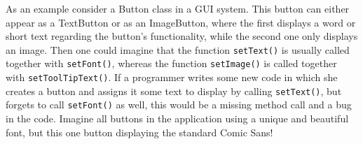As an example consider a Button class in a GUI system.
This button can either appear as a TextButton or as an ImageButton, where the first displays a word or short text regarding the button's functionality, while the second one only displays an image.
Then one could imagine that the function \texttt{setText()} is usually called together with \texttt{setFont()}, whereas the function \texttt{setImage()} is called together with \texttt{setToolTipText()}.
If a programmer writes some new code in which she creates a button and assigns it some text to display by calling \texttt{setText()}, but forgets to call \texttt{setFont()} as well, this would be a missing method call and a bug in the code.
Imagine all buttons in the application using a unique and beautiful font, but this one button displaying the standard Comic Sans!

